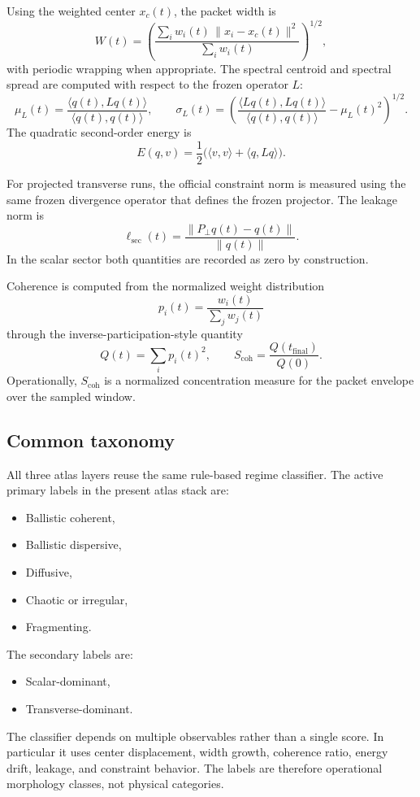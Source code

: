 \documentclass[11pt]{article}
\begin{document}
Using the weighted center $x_c(t)$, the packet width is
\begin{equation}
W(t) = \left( \frac{\sum_i w_i(t)\,\|x_i - x_c(t)\|^2}{\sum_i w_i(t)} \right)^{1/2},
\end{equation}
with periodic wrapping when appropriate. The spectral centroid and spectral spread are computed with respect to the frozen operator $L$:
\begin{equation}
\mu_L(t) = \frac{\langle q(t),Lq(t)\rangle}{\langle q(t),q(t)\rangle},
\qquad
\sigma_L(t) = \left(
\frac{\langle Lq(t),Lq(t)\rangle}{\langle q(t),q(t)\rangle}
- \mu_L(t)^2
\right)^{1/2}.
\end{equation}
The quadratic second-order energy is
\begin{equation}
E(q,v) = \frac{1}{2}\bigl(\langle v,v\rangle + \langle q,Lq\rangle\bigr).
\end{equation}

For projected transverse runs, the official constraint norm is measured using the same frozen divergence operator that defines the frozen projector. The leakage norm is
\begin{equation}
\ell_{\mathrm{sec}}(t) = \frac{\|P_{\perp}q(t)-q(t)\|}{\|q(t)\|}.
\end{equation}
In the scalar sector both quantities are recorded as zero by construction.

Coherence is computed from the normalized weight distribution
\begin{equation}
p_i(t) = \frac{w_i(t)}{\sum_j w_j(t)}
\end{equation}
through the inverse-participation-style quantity
\begin{equation}
Q(t) = \sum_i p_i(t)^2,
\qquad
S_{\mathrm{coh}} = \frac{Q(t_{\mathrm{final}})}{Q(0)}.
\end{equation}
Operationally, $S_{\mathrm{coh}}$ is a normalized concentration measure for the packet envelope over the sampled window.

\subsection{Common taxonomy}
All three atlas layers reuse the same rule-based regime classifier. The active primary labels in the present atlas stack are:
\begin{itemize}
\item Ballistic coherent,
\item Ballistic dispersive,
\item Diffusive,
\item Chaotic or irregular,
\item Fragmenting.
\end{itemize}
The secondary labels are:
\begin{itemize}
\item Scalar-dominant,
\item Transverse-dominant.
\end{itemize}
The classifier depends on multiple observables rather than a single score. In particular it uses center displacement, width growth, coherence ratio, energy drift, leakage, and constraint behavior. The labels are therefore operational morphology classes, not physical categories.
\end{document}
